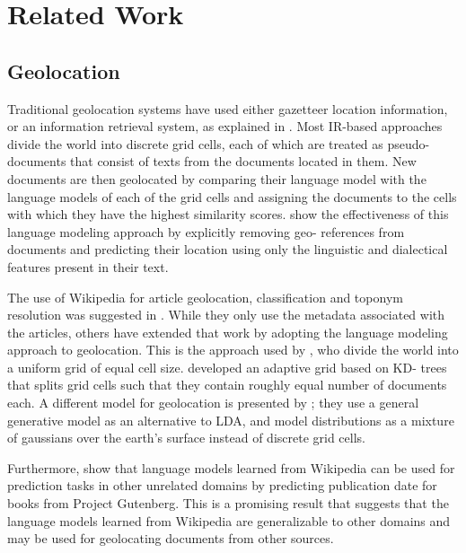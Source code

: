 \section{Related Work} 

\subsection{Geolocation}   

Traditional geolocation systems have used either
gazetteer location information, or an information retrieval system, as
explained in . Most IR-based approaches divide the world into
discrete grid cells, each of which are treated as pseudo-documents that
consist of texts from the documents located in them. New documents are then
geolocated by comparing their language model with the language models of each
of the grid cells and assigning the documents to the cells with which they
have the highest similarity scores.  show the
effectiveness of this language modeling approach by explicitly removing geo-
references from documents and predicting their location using only the
linguistic and dialectical features present in their text.

\par The use of Wikipedia for article geolocation, classification and toponym
resolution was suggested in . While they only use
the metadata associated with the articles, others have extended that work by
adopting the language modeling approach to geolocation.  This is the approach
used by , who divide the world into a uniform grid of
equal cell size.  developed an adaptive grid based on KD-
trees that splits grid cells such that they contain roughly equal number of
documents each. A different model for geolocation is presented by
; they use a general generative model as an
alternative to LDA, and model distributions as a mixture of gaussians over the
earth's surface instead of discrete grid cells.

\par Furthermore,  show that language models learned from
Wikipedia can be used for prediction tasks in other unrelated domains by
predicting publication date for books from Project Gutenberg. This is a
promising result that suggests that the language models learned from Wikipedia
are generalizable to other domains and may be used for geolocating documents
from other sources.

